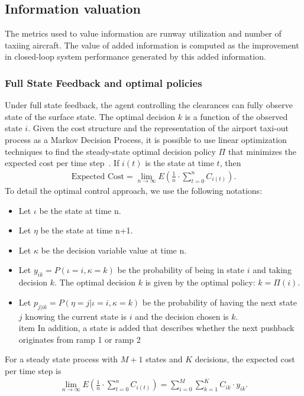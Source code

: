 \documentclass[letterpaper]{article}
\begin{document}
\subsection{Information valuation}
The metrics used to value information are runway utilization and number of taxiing aircraft. 
The value of added information is computed as the improvement in closed-loop system performance generated by this added information.


\subsubsection{Full State Feedback and optimal policies}\label{s:LP}

Under full state feedback, the agent controlling the clearances can fully observe state of the surface state.
The optimal decision $k$ is a function of the observed state $i$. Given the cost structure and the representation of the airport taxi-out process as a Markov Decision Process, it is possible to use linear optimization techniques to find the steady-state optimal decision policy $\Pi$ that minimizes
the expected cost per time step~\cite{Hiller2001}. If $i(t)$ is the state at time $t$, then
 \begin{eqnarray}
 \mbox{Expected Cost} = \displaystyle\lim_{n \to \infty} E \left( \frac{1}{n} \cdot \displaystyle\sum_{t=0}^n C_{i(t)} \right).
\end{eqnarray}
To detail the optimal control approach, we use the following notations:
\begin{itemize}
\item Let $\iota$ be the state at time n.
\item Let $\eta$  be the state at time n+1.
\item Let $\kappa$ be the decision variable value at time n.
\item Let $y_{ik} = P(\iota=i,\kappa=k)$ be the probability of being in state $i$ and taking decision $k$. The optimal decision $k$ is given by the optimal policy: $k = \Pi(i)$.
\item Let $p_{j|ik} = P(\eta=j|\iota=i,\kappa=k)$ be the probability of having the next state $j$ knowing the current state is $i$ and the decision chosen is $k$.
\\item In addition, a state is added that describes whether the next pushback originates from ramp 1 or ramp 2 
\end{itemize}

For a steady state process with $M+1$ states and $K$ decisions, the expected cost per time step is \cite{Hiller2001}
   \begin{eqnarray}\label{e:costEquation}
   \displaystyle\lim_{n \to \infty} E(\frac{1}{n} \cdot \displaystyle\sum_{t=0}^n C_{i(t)}) = \displaystyle\sum_{i=0}^M \displaystyle\sum_{k=1}^K C_{ik}\cdot y_{ik}.
    \end{eqnarray}
\end{document}
